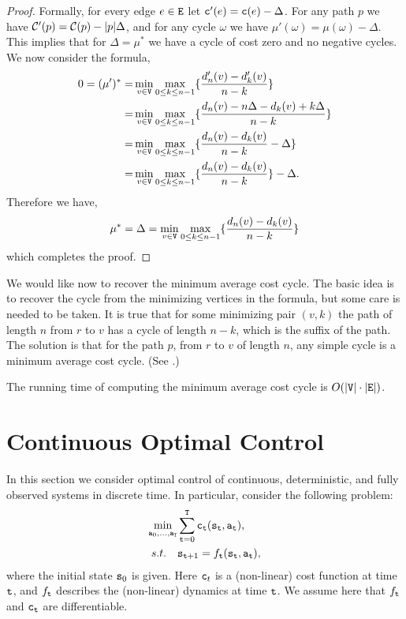 \begin{proof}
Formally, for every edge $e\in {\tt E}$ let ${\tt c}'(e)={\tt c}(e)-\Delta$.
For any path $p$ we have $\mathcal{C}'(p)=\mathcal{C}(p)-|p|\Delta$, and for any
cycle $\omega$ we have $\mu'(\omega)=\mu(\omega)-\Delta$. This
implies that for $\Delta=\mu^*$ we have a cycle of cost zero and no
negative cycles. We now consider the formula,
\begin{align*}
0=(\mu')^*=&\min_{v\in {\tt V}} \max_{0\leq k\leq n-1}
\{\frac{d'_n(v)-d'_{k}(v)}{n-k}\}\\
=&\min_{v\in {\tt V}} \max_{0\leq k\leq n-1}
\{\frac{d_n(v)-n\Delta-d_{k}(v)+k\Delta}{n-k}\}\\
=&\min_{v\in {\tt V}} \max_{0\leq k\leq n-1}
\{\frac{d_n(v)-d_{k}(v)}{n-k}-\Delta\}\\
=&\min_{v\in {\tt V}} \max_{0\leq k\leq n-1}
\{\frac{d_n(v)-d_{k}(v)}{n-k}\}-\Delta.
\end{align*}
Therefore we have,
\[
\mu^*=\Delta=\min_{v\in {\tt V}} \max_{0\leq k\leq n-1}
\{\frac{d_n(v)-d_{k}(v)}{n-k}\}   
\]
which completes the proof.
\end{proof}

We would like now to recover the minimum average cost cycle. The
basic idea is to recover the cycle from the minimizing vertices in
the formula, but some care is needed to be taken. It is true that for some
minimizing pair $(v,k)$ the path of length $n$ from $r$ to $v$ has a
cycle of length $n-k$, which is the suffix of the path. The solution
is that for the path $p$, from $r$ to $v$ of length $n$, any simple
cycle is a minimum average cost cycle. (See \cite{ChaturvediM17}.)

The running time of computing the minimum average cost cycle is
$O(|{\tt V}|\cdot |{\tt E}|)$.



\section{Continuous Optimal Control
}
In this section we consider optimal control of continuous, deterministic, and fully observed systems in discrete time. 
In particular, consider the following problem:
\begin{equation}\label{eq:opt_control}
    \begin{split}
        \min_{{\tt a}_0,\dots,{\tt a}_{{\tt T}}} & \sum_{{\tt t}=0}^{\tt T} {\tt c}_{\tt t}({\tt s}_{\tt t}, {\tt a}_{\tt t}), \\
        s.t. \quad & {{\tt s}_{{\tt t} + 1}} = {f_{\tt t}}({{\tt s}_{\tt t}},{{\tt a}_{\tt t}}), 
    \end{split}
\end{equation}
where the initial state ${\tt s}_0$ is given. Here ${\tt c}_t$ is a (non-linear) cost function at time ${\tt t}$, and $f_{\tt t}$ describes the (non-linear) dynamics  at time ${\tt t}$. We assume here that $f_{\tt t}$ and ${\tt c}_{\tt t}$ are differentiable.

